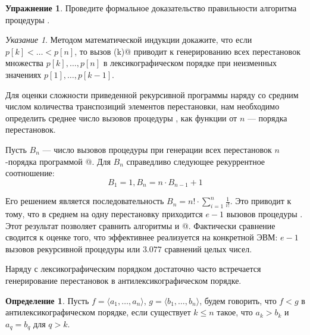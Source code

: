 \documentclass[12pt,a4paper]{article}
\theoremstyle{plain}
\theoremstyle{definition}
\newtheorem{definition}{Определение}
\newtheorem*{task}{Упражнение}
\theoremstyle{remark}
\newtheorem*{pointer}{Указание}
\begin{document}
\begin{task}
Проведите формальное доказательство правильности алгоритма процедуры \verb@LEC@. 
\begin{pointer}
Методом математической индукции докажите, что если $p[k]<\ldots<p[n]$, то вызов \verb@LEC(k)@ приводит к генерированию всех перестановок множества $p[k],\ldots,p[n]$ в лексикографическом порядке при неизменных значениях $p[1],\ldots,p[k-1]$.
\end{pointer}
\end{task}

Для оценки сложности приведенной рекурсивной программы наряду со средним числом количества транспозиций элементов перестановки, нам необходимо определить среднее число вызовов процедуры \verb@LEC@, как функции от $n$ --- порядка перестановок.

Пусть $B_n$ --- число вызовов процедуры \verb@LEC@ при генерации всех перестановок $n$-порядка программой @. Для $B_n$ справедливо следующее рекуррентное соотношение: \[ B_1 = 1, B_n = n\cdot B_{n-1} + 1 \]

Его решением является последовательность $B_n = n! \cdot \sum_{i=1}^{n} \frac{1}{i!}$. Это приводит к тому, что в среднем на одну перестановку приходится $e-1$ вызовов процедуры \verb@LEC@. Этот результат позволяет сравнить алгоритмы \verb@LEX@ и @. Фактически сравнение сводится к оценке того, что эффективнее реализуется на конкретной ЭВМ: $e-1$ вызовов рекурсивной процедуры или $3.077$ сравнений целых чисел.

Наряду с лексикографическим порядком достаточно часто встречается генерирование перестановок в антилексикографическом порядке.

\begin{definition}
Пусть $f=\langle a_1,\ldots,a_n \rangle$, $g=\langle b_1,\ldots,b_n\rangle$, будем говорить, что $f<g$ в антилексикографическом порядке, если существует $k\le n$ такое, что $a_k>b_k$ и $a_q=b_q$ для $q>k$.
\end{definition}
\end{document}

